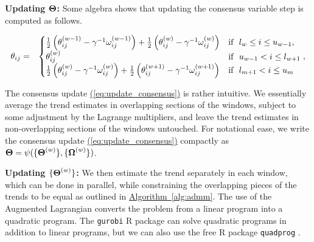 \documentclass[12pt]{article}
\newcommand{\Eqn}[1]{\hyperref[eq:#1]{{\rm (\ref*{eq:#1})}}} %
\newcommand{\Alg}[1]{\hyperref[alg:#1]{Algorithm~\ref*{alg:#1}}} %
\newcommand{\Eqn}[1]{{(\ref{eq:#1})}} %
\newcommand{\Alg}[1]{{Algorithm~\ref{alg:#1}}} %
\newcommand{\Inv}{^{-1}} %
\newcommand{\M}[1]{{\bm{\mathbf{\MakeUppercase{#1}}}}} %
\newcommand{\ME}[2]{\MakeLowercase{#1}_{#2}} %
\newcommand{\Mn}[2]{\M{#1}^{(#2)}} %
\newcommand{\MnE}[3]{\MakeLowercase{#1}^{(#2)}_{#3}} %
\begin{document}
{\bf Updating $\M{\Theta}$: } Some algebra shows that updating the consensus variable step is computed as follows.

\begin{eqnarray}
\label{eq:update_consensus}
\ME{\theta}{ij}	 &=& \begin{cases} 
			 \frac{1}{2}\left (\MnE{\theta}{w-1}{ij} - \gamma\Inv \MnE{\omega}{w-1}{ij} \right)
			 + 
			 \frac{1}{2} \left (\MnE{\theta}{w}{ij} - \gamma\Inv \MnE{\omega}{w}{ij} \right)
			  & \mbox{if~~} l_{w} \le i \le u_{w-1},  \\
			 \MnE{\theta}{w}{ij} & \mbox{if~~} u_{w-1} < i \le l_{w+1}  \\
			 \frac{1}{2} \left ( \MnE{\theta}{w}{ij} - \gamma\Inv \MnE{\omega}{w}{ij}\right )
			 + 
			 \frac{1}{2}	\left ( \MnE{\theta}{w+1}{ij} - \gamma\Inv \MnE{\omega}{w+1}{ij} \right )
			 & \mbox{if~~} l_{m+1} < i \le u_{m}  
			 \end{cases},
\end{eqnarray}	

The consensus update \Eqn{update_consensus} is rather intuitive. We essentially average the trend estimates in overlapping sections of the windows, subject to some adjustment by the Lagrange multipliers, and leave the trend estimates in non-overlapping sections of the windows untouched. 
For notational ease, we write the consensus update \Eqn{update_consensus} compactly as $\M{\Theta} = \psi(\{\Mn{\Theta}{w}\},\{\Mn{\Omega}{w}\})$.

{\bf Updating $\{\Mn{\Theta}{w}\}$: } We then estimate the trend separately in each window, which can be done in parallel, while constraining the overlapping pieces of the trends to be equal as outlined in \Alg{admm}. The use of the Augmented Lagrangian converts the problem from a linear program into a quadratic program. The \texttt{gurobi} R package \citep{gurobi} can solve quadratic programs in addition to linear programs, but we can also use the free R package \texttt{quadprog} \citep{quadprog}. 
	 
\end{document}
